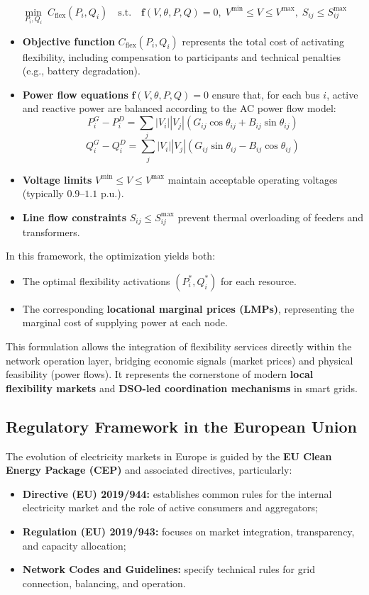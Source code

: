 \documentclass[11pt]{article}
\begin{document}
	\[
	\min_{P_i, Q_i} \; C_\text{flex}(P_i, Q_i)
	\quad \text{s.t.} \quad
	\mathbf{f}(V, \theta, P, Q) = 0, \;
	V^{\min} \le V \le V^{\max}, \;
	S_{ij} \le S_{ij}^{\max}
	\]
	
	\begin{itemize}
		\item \textbf{Objective function} $C_\text{flex}(P_i, Q_i)$ represents the total cost of activating flexibility, including compensation to participants and technical penalties (e.g., battery degradation).
		\item \textbf{Power flow equations} $\mathbf{f}(V, \theta, P, Q) = 0$ ensure that, for each bus $i$, active and reactive power are balanced according to the AC power flow model:
		\[
		P_i^{G} - P_i^{D} = \sum_{j} |V_i||V_j|(G_{ij}\cos\theta_{ij} + B_{ij}\sin\theta_{ij})
		\]
		\[
		Q_i^{G} - Q_i^{D} = \sum_{j} |V_i||V_j|(G_{ij}\sin\theta_{ij} - B_{ij}\cos\theta_{ij})
		\]
		\item \textbf{Voltage limits} $V^{\min} \le V \le V^{\max}$ maintain acceptable operating voltages (typically $0.9$–$1.1$ p.u.).
		\item \textbf{Line flow constraints} $S_{ij} \le S_{ij}^{\max}$ prevent thermal overloading of feeders and transformers.
	\end{itemize}
	
	In this framework, the optimization yields both:
	\begin{itemize}
		\item The optimal flexibility activations $(P_i^*, Q_i^*)$ for each resource.
		\item The corresponding \textbf{locational marginal prices (LMPs)}, representing the marginal cost of supplying power at each node.
	\end{itemize}
	
	This formulation allows the integration of flexibility services directly within the network operation layer, bridging economic signals (market prices) and physical feasibility (power flows).  
	It represents the cornerstone of modern \textbf{local flexibility markets} and \textbf{DSO-led coordination mechanisms} in smart grids.
	
	\subsection{Regulatory Framework in the European Union}
	
	The evolution of electricity markets in Europe is guided by the \textbf{EU Clean Energy Package (CEP)} and associated directives, particularly:
	\begin{itemize}
		\item \textbf{Directive (EU) 2019/944:} establishes common rules for the internal electricity market and the role of active consumers and aggregators;
		\item \textbf{Regulation (EU) 2019/943:} focuses on market integration, transparency, and capacity allocation;
		\item \textbf{Network Codes and Guidelines:} specify technical rules for grid connection, balancing, and operation.
	\end{itemize}
	
\end{document}
